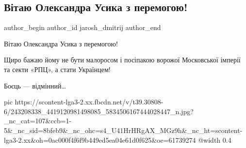  
 
 
 
 
 
\subsection{Вітаю Олександра Усика з перемогою!}
\label{sec:26_09_2021.fb.jarosh_dmitrij.1.usik_vitannja}
 
\ifcmt
 author_begin
   author_id jarosh_dmitrij
 author_end
\fi

Вітаю Олександра Усика з перемогою!

Щиро бажаю йому не бути малоросом і посіпакою ворожої Московської імперії та
секти «РПЦ», а стати Українцем!

Боєць — відмінний…

\ifcmt
  pic https://scontent-lga3-2.xx.fbcdn.net/v/t39.30808-6/243208338_4419120981498085_5834506167444028447_n.jpg?_nc_cat=107&ccb=1-5&_nc_sid=8bfeb9&_nc_ohc=s4_U41HrHRgAX_MGz9h&_nc_ht=scontent-lga3-2.xx&oh=0ac000f4f6f9b449ed5ea04e61d0f625&oe=61739274
  @width 0.4
\fi
